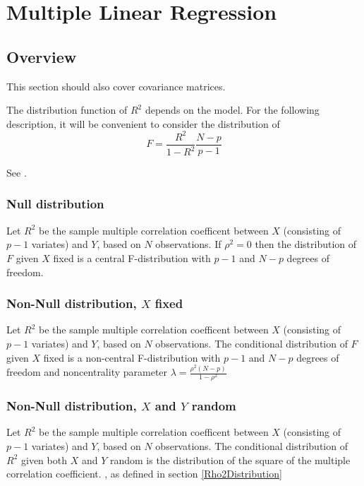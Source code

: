 \newpage
\section{Multiple Linear Regression}
\label{MultipleLinearRegression}

\subsection{Overview}
\label{MultipleLinearRegressionOverview}

This section should also cover covariance matrices.

The distribution function of $R^2$ depends on the model. For the following description, it will be convenient to consider the distribution of
\begin{equation}
	F=\frac{R^2}{1-R^2} \frac{N-p}{p-1}
\end{equation}

See \cite{Gatsonis_1989}.

\subsubsection{Null distribution}
Let $R^2$ be the sample multiple correlation coefficent between $X$ (consisting of $p-1$ variates) and $Y$, based on $N$ observations. If $\rho^2 = 0$ then the 
distribution of $F$ given $X$ fixed is a central F-distribution with $p-1$ and $N-p$ degrees of freedom.

\subsubsection{Non-Null distribution, $X$ fixed}
Let $R^2$ be the sample multiple correlation coefficent between $X$ (consisting of $p-1$ variates) and $Y$, based on $N$ observations. The conditional 
distribution of $F$ given $X$ fixed is a non-central F-distribution with $p-1$ and $N-p$ degrees of freedom and noncentrality parameter $\lambda=\frac{\rho^2(N-p)}{1-\rho^2}$  \citep{Anderson_book_2003}

\subsubsection{Non-Null distribution, $X$ and $Y$ random}
Let $R^2$ be the sample multiple correlation coefficent between $X$ (consisting of $p-1$ variates) and $Y$, based on $N$ observations. The conditional 
distribution of $R^2$ given both $X$ and $Y$ random is the distribution of the square of the multiple correlation coefficient. , as defined in section \ref{Rho2Distribution}   \citep{Anderson_book_2003}

